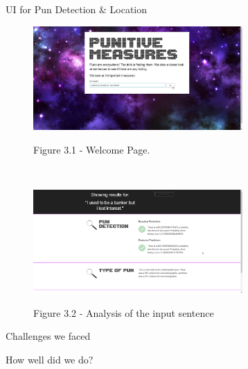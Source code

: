 \documentclass[final]{beamer}
\newlength{\sepwid}
\newlength{\onecolwid}
\begin{document}
\begin{frame}[t]
\begin{columns}[t]
    \begin{column}{\sepwid}\end{column}			%
    \begin{column}{\onecolwid}
            
\begin{block}{UI for Pun Detection \& Location}
\begin{figure}
\centering
\includegraphics[width=0.75\textwidth]{UI_1.jpg}\\
\caption{Figure 3.1 - Welcome Page.}
\end{figure}
\\
\vspace{10mm}
\begin{figure}
\centering
\includegraphics[width=0.75\textwidth]{UI_2.png}\\
\centering
\caption{Figure 3.2 - Analysis of the input sentence}
\end{figure}
\end{block}
\vspace{20mm}
            \begin{block}{Challenges we faced}
                    
            \end{block}
            \vspace{20mm}
            \begin{block}{How well did we do?}
                    
            \end{block}
            
		    
    \end{column}

      		
 \end{columns}
\end{frame}
\end{document}
